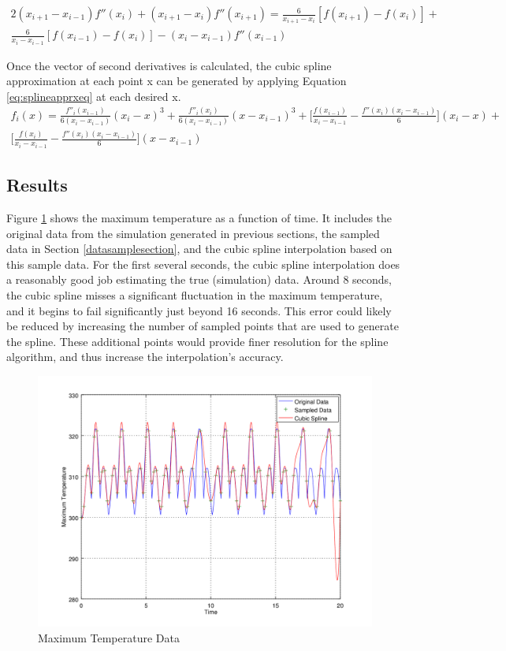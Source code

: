 \documentclass[12pt]{amsart}
\begin{document}
\begin{multline}
2(x_{i+1}-x_{i-1})f''(x_i) + (x_{i+1}-x_i)f''(x_{i+1})=\frac{6}{x_{i+1}-x_i} [ f(x_{i+1}) - f(x_i)] + \\ \frac{6}{x_i- x_{i-1}}[f(x_{i-1}) - f(x_i)]-(x_i-x_{i-1})f''(x_{i-1})
\label{eq:ddf}
\end{multline}

 Once the vector of second derivatives is calculated, the cubic spline approximation at each point x can be generated by applying Equation \ref{eq:splineapprxeq} at each desired x. 
\begin{multline}
f_i(x) = \frac{f''_i(x_{i-1})}{6(x_i - x_{i-1})}(x_i - x)^3 + \frac{f''_i(x_{i})}{6(x_i - x_{i-1})}(x - x_{i-1})^3+ \big[\frac{f(x_{i-1})}{x_i-x_{i-1}} - \frac{f''(x_i)(x_i-x_{i-1})}{6} \big](x_i - x) + \\ \big[\frac{f(x_{i})}{x_i-x_{i-1}} - \frac{f''(x_i)(x_i-x_{i-1})}{6} \big](x-x_{i-1})
\label{eq:splineapprxeq}
\end{multline}

\subsection{Results}
Figure \ref{fig:cubicspline} shows the maximum temperature as a function of time. It includes the original data from the simulation generated in previous sections, the sampled data in Section \ref{datasamplesection}, and the cubic spline interpolation based on this sample data. For the first several seconds, the cubic spline interpolation does a reasonably good job estimating the true (simulation) data. Around 8 seconds, the cubic spline misses a significant fluctuation in the maximum temperature, and it begins to fail significantly just beyond 16 seconds. This error could likely be reduced by increasing the number of sampled points that are used to generate the spline. These additional points would provide finer resolution for the spline algorithm, and thus increase the interpolation's accuracy. 
\begin{center}
\begin{figure}
\includegraphics[scale=0.7]{task4fig2}
\caption{Maximum Temperature Data}
\label{fig:cubicspline}
\end{figure}
\end{center}
\end{document}
